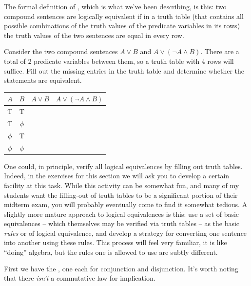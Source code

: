 The formal definition of , 
which is what we've
been describing, is this:  two compound sentences are logically equivalent
if in a truth table (that contains all possible combinations of the 
truth values of the predicate variables in its rows) the truth values
of the two sentences are equal in every row. 

\begin{exer} 
Consider the two compound sentences $A \lor B$ and $A \lor ({\lnot}A \land B)$.
There are a total of 2 predicate variables between them, so a truth table
with 4 rows will suffice.  Fill out the missing entries in the truth
table and determine whether the statements are equivalent.

\begin{center}
\begin{tabular}{c|c||c|c}
\; $A$ \; & \; $B$ \; & \; $A \lor B$ \; & \; $A \lor ({\lnot}A \land B)$\; \\ \hline
T & T &  & \\
T & $\phi$ & & \\
 $\phi$ & T & &  \\
 $\phi$ &  $\phi$  & &\\
\end{tabular}
\end{center}

\end{exer}

One could, in principle, verify all logical equivalences by filling out
truth tables.  Indeed, in the exercises for this section we will ask you
to develop a certain facility at this task.  While this activity can
be somewhat fun, and many of my students want the filling-out of truth 
tables to
be a significant portion of their midterm exam, you will probably eventually
come to find it somewhat tedious.  A slightly more mature approach to logical
equivalences is this: use a set of basic equivalences -- which themselves
may be verified via truth tables -- as the basic {\em rules} or 
of logical equivalence, and develop a strategy for converting one
sentence into another using these rules.  This process will feel very
familiar, it is like ``doing'' algebra, but the rules one is allowed 
to use are subtly different.

First we have the , 
one each for conjunction
and disjunction.  It's worth noting that there {\em isn't} a commutative
law for implication.   

